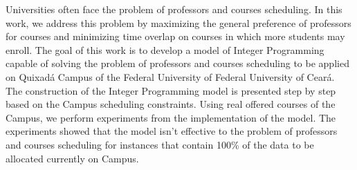 Universities often face the problem of professors and courses scheduling. In this work, we address this problem by maximizing the general preference of professors for courses and minimizing time overlap on courses in which more students may enroll. The goal of this work is to develop a model of Integer Programming capable of solving the problem of professors and courses scheduling to be applied on Quixadá Campus of the Federal University of Federal University of Ceará. The construction of the Integer Programming model is presented step by step based on the Campus scheduling constraints. Using real offered courses of the Campus, we perform experiments from the implementation of the model. The experiments showed that the model isn't effective to the problem of professors and courses scheduling for instances that contain 100\% of the data to be allocated currently on Campus.

